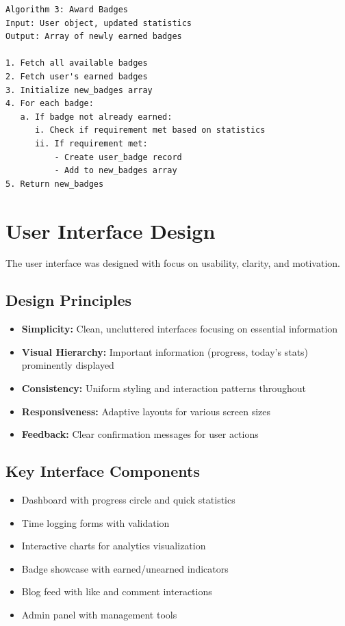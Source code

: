 \documentclass[12pt,a4paper]{report}
\newcommand{\JustifiedNormal}{\fontsize{12}{14}\selectfont\justifying\setlength{\parindent}{0pt}}
\begin{document}
\begin{verbatim}
Algorithm 3: Award Badges
Input: User object, updated statistics
Output: Array of newly earned badges

1. Fetch all available badges
2. Fetch user's earned badges
3. Initialize new_badges array
4. For each badge:
   a. If badge not already earned:
      i. Check if requirement met based on statistics
      ii. If requirement met:
          - Create user_badge record
          - Add to new_badges array
5. Return new_badges
\end{verbatim}

\section{User Interface Design}
\JustifiedNormal
The user interface was designed with focus on usability, clarity, and motivation.

\subsection{Design Principles}
\begin{itemize}
  \item \textbf{Simplicity:} Clean, uncluttered interfaces focusing on essential information
  \item \textbf{Visual Hierarchy:} Important information (progress, today's stats) prominently displayed
  \item \textbf{Consistency:} Uniform styling and interaction patterns throughout
  \item \textbf{Responsiveness:} Adaptive layouts for various screen sizes
  \item \textbf{Feedback:} Clear confirmation messages for user actions
\end{itemize}

\subsection{Key Interface Components}
\begin{itemize}
  \item Dashboard with progress circle and quick statistics
  \item Time logging forms with validation
  \item Interactive charts for analytics visualization
  \item Badge showcase with earned/unearned indicators
  \item Blog feed with like and comment interactions
  \item Admin panel with management tools
\end{itemize}
\end{document}
